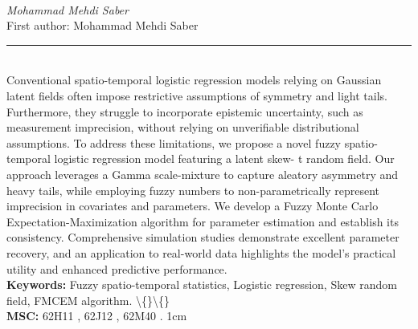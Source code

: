 \documentclass[10pt,twoside]{article}
\begin{document}
\noindent\begin{minipage}[t][\textheight]{\textwidth}
\\[0.35em]
{\itshape Mohammad Mehdi Saber}\\[0.2em]
{\footnotesize First author: Mohammad Mehdi Saber}\\[0.45em]
\noindent\rule{\textwidth}{0.3pt}\\[0.4em]
{\footnotesize  Conventional spatio-temporal logistic regression models relying on Gaussian latent fields often impose restrictive assumptions of symmetry and light tails. Furthermore, they struggle to incorporate epistemic uncertainty, such as measurement imprecision, without relying on unverifiable distributional assumptions. To address these limitations, we propose a novel fuzzy spatio-temporal logistic regression model featuring a latent skew- t random field. Our approach leverages a Gamma scale-mixture to capture aleatory asymmetry and heavy tails, while employing fuzzy numbers to non-parametrically represent imprecision in covariates and parameters. We develop a Fuzzy Monte Carlo Expectation-Maximization algorithm for parameter estimation and establish its consistency. Comprehensive simulation studies demonstrate excellent parameter recovery, and an application to real-world data highlights the model's practical utility and enhanced predictive performance.}\\[0.4em]
{\footnotesize\bfseries Keywords:} {\footnotesize Fuzzy spatio-temporal statistics, Logistic regression, Skew random field, FMCEM algorithm. \textbackslash\{\}\textbackslash\{\}}\\[0.15em]
{\footnotesize\bfseries MSC:} {\footnotesize 62H11 , 62J12 , 62M40 . 1cm}\\
\vfill
\end{minipage}
\newpage
\end{document}
